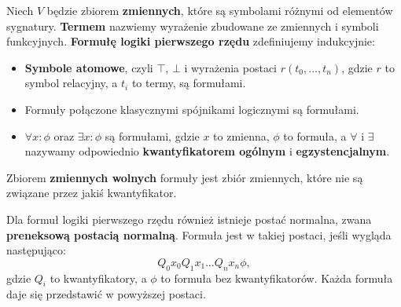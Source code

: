 Niech $V$ będzie zbiorem \textbf{zmiennych}, które są symbolami różnymi od elementów sygnatury. \textbf{Termem} nazwiemy wyrażenie zbudowane ze zmiennych i symboli funkcyjnych. \textbf{Formułę logiki pierwszego rzędu} zdefiniujemy indukcyjnie:
\begin{itemize}
\item \textbf{Symbole atomowe}, czyli $\top$, $\bot$ i wyrażenia postaci $r(t_0, \ldots, t_n)$, gdzie $r$ to symbol relacyjny, a $t_i$ to termy, są formułami.
\item Formuły połączone klasycznymi spójnikami logicznymi są formułami.
\item $\forall x : \phi$ oraz $\exists x : \phi$ są formułami, gdzie $x$ to zmienna, $\phi$ to formuła, a $\forall$ i $\exists$ nazywamy odpowiednio \textbf{kwantyfikatorem ogólnym} i \textbf{egzystencjalnym}. 
\end{itemize}

Zbiorem \textbf{zmiennych wolnych} formuły jest zbiór zmiennych, które nie są związane przez jakiś kwantyfikator.

Dla formuł logiki pierwszego rzędu również istnieje postać normalna, zwana \textbf{preneksową postacią normalną}. Formuła jest w takiej postaci, jeśli wygląda następująco:
\[
Q_0 x_0 Q_1 x_1 \ldots Q_n x_n \phi,
\]
gdzie $Q_i$ to kwantyfikatory, a $\phi$ to formuła bez kwantyfikatorów. Każda formuła daje się przedstawić w powyższej postaci.

